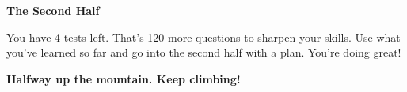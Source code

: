 {\begin{tcolorbox}[
    enhanced,
    colback=funYellowLight,
    colframe=funYellow!60,
    arc=10pt,
    boxrule=1pt,
    left=6mm, right=6mm, top=4mm, bottom=4mm,
]
{\bfseries\color{funYellowDark} \faLightbulb\hspace{2mm}The Second Half}

\vspace{2mm}

You have 4 tests left. That's 120 more questions to sharpen your skills. Use what you've learned so far and go into the second half with a plan. You're doing great!
\end{tcolorbox}

\vspace{4mm}

\begin{center}
{\large\bfseries\color{funTealDark} \faMountain\hspace{2mm}Halfway up the mountain. Keep climbing!\hspace{2mm}\faMountain}
\end{center}

}
\newpage
